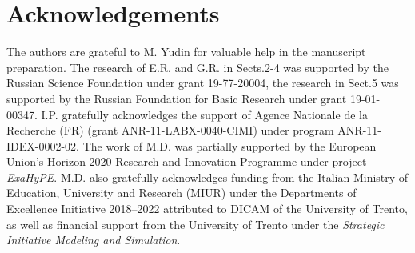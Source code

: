 \documentclass[3p,times,table]{article}
\begin{document}
\section*{Acknowledgements}
% 
The authors are grateful to M. Yudin for valuable help in the manuscript 
preparation.
The research of E.R. and G.R. in Sects.2-4 was supported by the Russian Science Foundation  under grant 19-77-20004, the research in Sect.5 was supported by the Russian Foundation for Basic Research under grant 19-01-00347.
I.P. gratefully acknowledges the support of Agence Nationale de la Recherche (FR) 
(grant ANR-11-LABX-0040-CIMI) under program ANR-11-IDEX-0002-02.
The work of M.D. was partially supported by the European Union's Horizon 2020 Research and Innovation  Programme under project \textit{ExaHyPE}. 
M.D. also gratefully acknowledges funding from the Italian Ministry of Education, University and Research (MIUR) under the Departments of Excellence Initiative 2018--2022 attributed to DICAM of the University of Trento, as well as financial support from the University of Trento under the  \textit{Strategic Initiative Modeling and Simulation}.



\printbibliography
\end{document}
